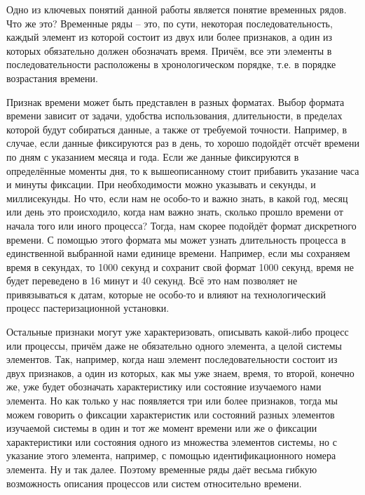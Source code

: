 {\cyrillicfont %
\fontsize{13pt}{16.25pt}\selectfont %
\setlength{\parindent}{1.25cm} %
\englishfont

\par Одно из ключевых понятий данной работы является понятие временных рядов. Что же это? Временные ряды – это, по сути, некоторая последовательность, каждый элемент из которой состоит из двух или более признаков, а один из которых обязательно должен обозначать время. Причём, все эти элементы в последовательности расположены в хронологическом порядке, т.е. в порядке возрастания времени. 

\par Признак времени может быть представлен в разных форматах. Выбор формата времени зависит от задачи, удобства использования, длительности, в пределах которой будут собираться данные, а также от требуемой точности. Например, в случае, если данные фиксируются раз в день, то хорошо подойдёт отсчёт времени по дням с указанием месяца и года. Если же данные фиксируются в определённые моменты дня, то к вышеописанному стоит прибавить указание часа и минуты фиксации. При необходимости можно указывать и секунды, и миллисекунды. Но что, если нам не особо-то и важно знать, в какой год, месяц или день это происходило, когда нам важно знать, сколько прошло времени от начала того или иного процесса? Тогда, нам скорее подойдёт формат дискретного времени. С помощью этого формата мы может узнать длительность процесса в единственной выбранной нами единице времени. Например, если мы сохраняем время в секундах, то 1000 секунд и сохранит свой формат 1000 секунд, время не будет переведено в 16 минут и 40 секунд. Всё это нам позволяет не привязываться к датам, которые не особо-то и влияют на технологический процесс пастеризационной установки.

\par Остальные признаки могут уже характеризовать, описывать какой-либо процесс или процессы, причём даже не обязательно одного элемента, а целой системы элементов. Так, например, когда наш элемент последовательности состоит из двух признаков, а один из которых, как мы уже знаем, время, то второй, конечно же, уже будет обозначать характеристику или состояние изучаемого нами элемента. Но как только у нас появляется три или более признаков, тогда мы можем говорить о фиксации характеристик или состояний разных элементов изучаемой системы в один и тот же момент времени или же о фиксации характеристики или состояния одного из множества элементов системы, но с указание этого элемента, например, с помощью идентификационного номера элемента. Ну и так далее. Поэтому временные ряды даёт весьма гибкую возможность описания процессов или систем относительно времени. 

}
